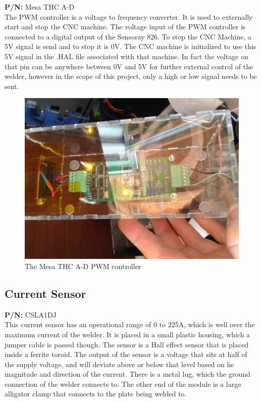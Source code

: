\documentclass[12pt]{article}
\begin{document}
\textbf{P/N:} Mesa THC A-D \\

The PWM controller is a voltage to frequency converter. It is used to externally start and stop the CNC machine. The voltage input of the PWM controller is connected to a digital output of the Sensoray 826. To stop the CNC Machine, a 5V signal is send and to stop it is 0V. The CNC machine is initialized to use this 5V signal in the .HAL file associated with that machine. In fact the voltage on that pin can be anywhere between 0V and 5V for further external control of the welder, however in the scope of this project, only a high or low signal needs to be sent.

\begin{figure}[!h]
\centering
\includegraphics[scale=0.55]{pm}
\caption{The Mesa THC A-D PWM controller}
\end{figure}


\clearpage


\subsection{Current Sensor}

\textbf{P/N:} CSLA1DJ \\

This current sensor has an operational range of 0 to 225A, which is well over the maximum current of the welder. It is placed in a small plastic housing, which a jumper cable is passed though. The sensor is a Hall effect sensor that is placed inside a ferrite toroid. The output of the sensor is a voltage that sits at half of the supply voltage, and will deviate above or below that level based on he magnitude and direction of the current. There is a metal lug, which the ground connection of the welder connects to. The other end of the module is a large alligator clamp that connects to the plate being welded to.
\end{document}

